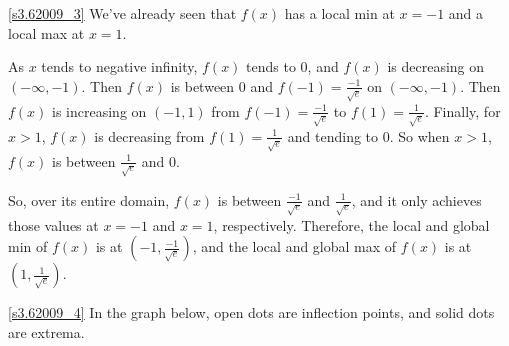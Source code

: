 \begin{solution}
\eqref{s3.62009_3} We've already seen that $f(x)$ has a local min at $x=-1$ and a local max at $x=1$.

As $x$ tends to negative infinity, $f(x)$ tends to 0, and $f(x)$ is decreasing on $(-\infty,-1)$. Then $f(x)$ is between $0$ and $f(-1)=\frac{-1}{\sqrt{e}}$ on $(-\infty,-1)$. Then $f(x)$ is increasing on $(-1,1)$ from $f(-1)=\frac{-1}{\sqrt{e}}$ to $f(1)=\frac{1}{\sqrt{e}}$. Finally, for $x>1$, $f(x)$ is decreasing from $f(1)=\frac{1}{\sqrt{e}}$ and tending to 0. So when $x>1$, $f(x)$ is between $\frac{1}{\sqrt{e}}$ and $0$.

So, over its entire domain, $f(x)$ is between $\frac{-1}{\sqrt{e}}$ and $\frac{1}{\sqrt{e}}$, and it only achieves those values at $x=-1$ and $x=1$, respectively. Therefore, the local and global min of $f(x)$ is at $(-1,\frac{-1}{\sqrt{e}})$, and the local and global max of $f(x)$ is at $(1,\frac{1}{\sqrt{e}})$.

\eqref{s3.62009_4}
In the graph below, open dots are inflection points, and
solid dots are extrema.
\begin{center}\end{center}
\end{solution}


